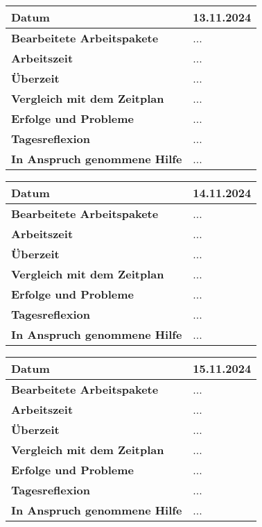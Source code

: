 \begin{longtable}{p{}|p{}}
	\hline
	\textbf{Datum}                       & 13.11.2024            \\
	\hline
	\textbf{Bearbeitete Arbeitspakete}   & ...                  \\
	\hline
	\textbf{Arbeitszeit}                 & ...                                    \\
	\hline
	\textbf{Überzeit}                    & ...                                    \\
	\hline
	\textbf{Vergleich mit dem Zeitplan}  & ... \\
	\hline
	\textbf{Erfolge und Probleme} & ...
	\\
	\hline
	\textbf{Tagesreflexion} & ...
	\\
	\hline
	\textbf{In Anspruch genommene Hilfe} & ...                              \\
	\hline
\end{longtable}\label{tab:arbeitsprotokoll-13.11.2024}
\newpage

\begin{longtable}{p{}|p{}}
	\hline
	\textbf{Datum}                       & 14.11.2024            \\
	\hline
	\textbf{Bearbeitete Arbeitspakete}   & ...                  \\
	\hline
	\textbf{Arbeitszeit}                 & ...                                    \\
	\hline
	\textbf{Überzeit}                    & ...                                    \\
	\hline
	\textbf{Vergleich mit dem Zeitplan}  & ... \\
	\hline
	\textbf{Erfolge und Probleme} & ...
	\\
	\hline
	\textbf{Tagesreflexion} & ...
	\\
	\hline
	\textbf{In Anspruch genommene Hilfe} & ...                              \\
	\hline
\end{longtable}\label{tab:arbeitsprotokoll-14.11.2024}
\newpage

\begin{longtable}{p{}|p{}}
	\hline
	\textbf{Datum}                       & 15.11.2024            \\
	\hline
	\textbf{Bearbeitete Arbeitspakete}   & ...                  \\
	\hline
	\textbf{Arbeitszeit}                 & ...                                    \\
	\hline
	\textbf{Überzeit}                    & ...                                    \\
	\hline
	\textbf{Vergleich mit dem Zeitplan}  & ... \\
	\hline
	\textbf{Erfolge und Probleme} & ...
	\\
	\hline
	\textbf{Tagesreflexion} & ...
	\\
	\hline
	\textbf{In Anspruch genommene Hilfe} & ...                              \\
	\hline
\end{longtable}\label{tab:arbeitsprotokoll-15.11.2024}
\newpage


